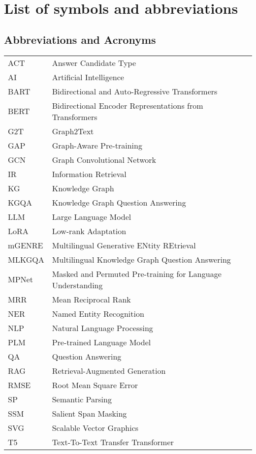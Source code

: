 

\chapter*{List of symbols and abbreviations}

\section*{Abbreviations and Acronyms}
\begin{tabularx}{\textwidth}{lX}
    ACT & Answer Candidate Type \\
    AI & Artificial Intelligence \\
    BART & Bidirectional and Auto-Regressive Transformers \\
    BERT & Bidirectional Encoder Representations from Transformers \\
    G2T & Graph2Text \\
    GAP & Graph-Aware Pre-training \\
    GCN & Graph Convolutional Network \\
    IR & Information Retrieval \\
    KG & Knowledge Graph \\
    KGQA & Knowledge Graph Question Answering \\
    LLM & Large Language Model \\
    LoRA & Low-rank Adaptation \\
    mGENRE & Multilingual Generative ENtity REtrieval \\
    MLKGQA & Multilingual Knowledge Graph Question Answering \\
    MPNet & Masked and Permuted Pre-training for Language Understanding \\
    MRR & Mean Reciprocal Rank \\
    NER & Named Entity Recognition \\
    NLP & Natural Language Processing \\
    PLM & Pre-trained Language Model \\
    QA & Question Answering \\
    RAG & Retrieval-Augmented Generation \\
    RMSE & Root Mean Square Error \\
    SP & Semantic Parsing \\
    SSM & Salient Span Masking \\
    SVG & Scalable Vector Graphics \\
    T5 & Text-To-Text Transfer Transformer \\
\end{tabularx}

